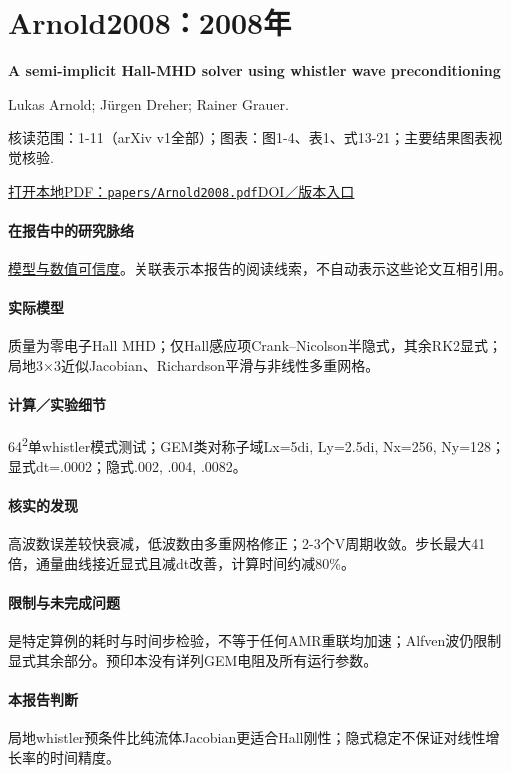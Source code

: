 \section{Arnold2008：2008年}\label{paper:Arnold2008}

\textbf{A semi-implicit Hall-MHD solver using whistler wave preconditioning}\citep{Arnold2008}\

Lukas Arnold;  Jürgen Dreher;  Rainer Grauer.

\textsf{核读范围：}1-11（arXiv v1全部）；\textsf{图表：}图1-4、表1、式13-21；主要结果图表视觉核验.

\href{run:papers/Arnold2008.pdf}{打开本地PDF：\texttt{papers/Arnold2008.pdf}}\quad\href{https://doi.org/10.1016/j.cpc.2007.11.018}{DOI／版本入口}

\paragraph{在报告中的研究脉络}\hyperref[ch:numerics]{模型与数值可信度}。关联表示本报告的阅读线索，不自动表示这些论文互相引用。

\paragraph{实际模型}质量为零电子Hall MHD；仅Hall感应项Crank–Nicolson半隐式，其余RK2显式；局地3×3近似Jacobian、Richardson平滑与非线性多重网格。

\paragraph{计算／实验细节}64\textsuperscript{2}单whistler模式测试；GEM类对称子域Lx=5di, Ly=2.5di, Nx=256, Ny=128；显式dt=.0002；隐式.002, .004, .0082。

\paragraph{核实的发现}高波数误差较快衰减，低波数由多重网格修正；2-3个V周期收敛。步长最大41倍，通量曲线接近显式且减dt改善，计算时间约减80\%。

\paragraph{限制与未完成问题}是特定算例的耗时与时间步检验，不等于任何AMR重联均加速；Alfven波仍限制显式其余部分。预印本没有详列GEM电阻及所有运行参数。

\paragraph{本报告判断}局地whistler预条件比纯流体Jacobian更适合Hall刚性；隐式稳定不保证对线性增长率的时间精度。

